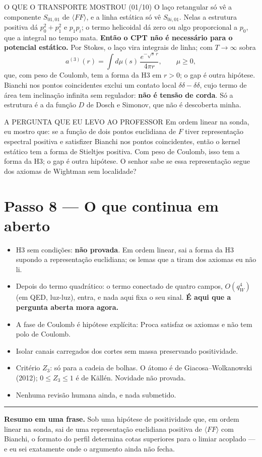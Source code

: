 \documentclass[11pt,a4paper]{article}
\begin{document}
\begin{caixa}{O QUE O TRANSPORTE MOSTROU (01/10)}
O laço retangular só vê a componente $S_{01,01}$ de $\langle FF\rangle$, e a
linha estática só vê $S_{0i,01}$. Nelas a estrutura positiva dá
$p_0^2+p_1^2$ e $p_1p_i$; o termo helicoidal dá zero ou algo proporcional a
$p_0$, que a integral no tempo mata. \textbf{Então o CPT não é necessário para
o potencial estático.} Por Stokes, o laço vira integrais de linha; com
$T\to\infty$ sobra
\[
a^{(3)}(r)=\int d\mu(s)\,\frac{e^{-\sqrt s\,r}}{4\pi r},\qquad \mu\ge0,
\]
que, com peso de Coulomb, tem a forma da H3 em $r>0$; o gap é outra
hipótese. Bianchi nos pontos coincidentes exclui um contato local
$\delta\delta-\delta\delta$, cujo termo de área tem inclinação infinita sem
regulador: \textbf{não é tensão de corda}. Só a estrutura é a da função $D$
de Dosch e Simonov, que não é descoberta minha.
\end{caixa}

\begin{caixa}{A PERGUNTA QUE EU LEVO AO PROFESSOR}
Em ordem linear na sonda, eu mostro que: se a função de dois pontos
euclidiana de $F$ tiver representação espectral positiva e satisfizer Bianchi
nos pontos coincidentes, então o kernel estático tem a forma de Stieltjes
positiva. Com peso de Coulomb, isso tem a forma da H3; o gap é outra
hipótese. O senhor sabe se essa representação segue dos axiomas de Wightman
sem localidade?
\end{caixa}

\section*{Passo 8 --- O que continua em aberto}

\begin{itemize}[leftmargin=6mm,itemsep=2pt]
\item H3 sem condições: \textbf{não provada}. Em ordem linear, sai a forma da
  H3 supondo a representação euclidiana; os lemas que a tiram dos axiomas eu
  não li.
\item Depois do termo quadrático: o termo conectado de quatro campos,
  $O(q_W^4)$ (em QED, luz-luz), entra, e nada aqui fixa o seu sinal.
  \textbf{É aqui que a pergunta aberta mora agora.}
\item A fase de Coulomb é hipótese explícita: Proca satisfaz os axiomas e
  não tem polo de Coulomb.
\item Isolar canais carregados dos cortes sem massa preservando positividade.
\item Critério $Z_3$: só para a cadeia de bolhas. O átomo é de
  Giacosa--Wolkanowski (2012); $0\le Z_3\le1$ é de Källén. Novidade não provada.
\item Nenhuma revisão humana ainda, e nada submetido.
\end{itemize}

\vspace{2mm}\hrule\vspace{2mm}
{\small\color{rust}\textbf{Resumo em uma frase.} Sob uma hipótese de
positividade que, em ordem linear na sonda, sai de uma representação
euclidiana positiva de $\langle FF\rangle$ com Bianchi, o formato do perfil
determina cotas superiores para o limiar acoplado --- e eu sei exatamente onde
o argumento ainda não fecha.}
\end{document}
